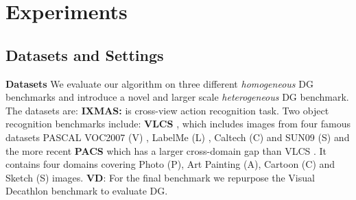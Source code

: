 \documentclass[10pt,twocolumn,letterpaper]{article}
\newcommand{\keypoint}[1]{\vspace{0.1cm}\noindent\textbf{#1}\quad}
\begin{document}
\section{Experiments}
\subsection{Datasets and Settings}
\keypoint{Datasets}
We evaluate our algorithm on three different \emph{homogeneous} DG benchmarks and introduce a  novel and larger scale \emph{heterogeneous} DG benchmark. The datasets are: \textbf{IXMAS:} \cite{daniel2006ixmax} is cross-view action recognition task. Two object recognition benchmarks include: \textbf{VLCS} \cite{chen2013vlcs}, which includes images from four famous datasets PASCAL VOC2007 (V) \cite{Everingham10}, LabelMe (L) \cite{russell08labelme}, Caltech (C) \cite{Feifei2004caltech} and SUN09 (S) \cite{Choi2010sun09} and the more recent \textbf{PACS} which has a larger cross-domain gap than VLCS \cite{Li2017dg}. It contains four domains covering Photo (P), Art Painting (A), Cartoon (C) and Sketch (S) images. \textbf{VD}: For the final benchmark we repurpose the Visual Decathlon \cite{Rebuffi17} benchmark to evaluate DG.
\end{document}
